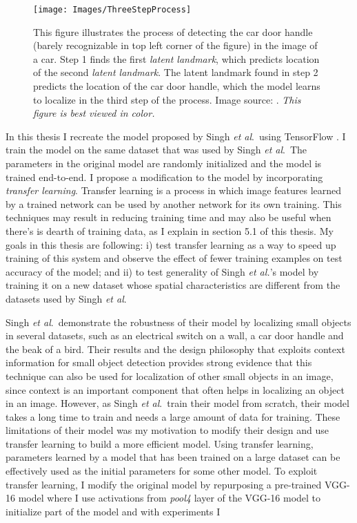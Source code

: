 \documentclass [11pt,letterpaper ,twoside ,openany ]{report}
\begin{document}
    \begin{wrapfigure}{l}[9mm]{0.5\textwidth}
        \begin{center}
            \texttt{[image: Images/ThreeStepProcess]}
        \end{center}
        \caption{This figure illustrates the process of detecting the car door handle (barely recognizable in top left corner of the figure) in the image of a car. Step 1 finds the first \textit{latent landmark}, which predicts location of the second \textit{latent landmark}. The latent landmark found in step 2 predicts the location of the car door handle, which the model learns to localize in the third step of the process. Image source: \cite{Singh_2016_CVPR}. \textit{This figure is best viewed in color.}}
    \end{wrapfigure}            

    In this thesis I recreate the model proposed by Singh \textit{et al}.\ using TensorFlow \cite{girija2016tensorflow}. I train the model on the same dataset that was used by Singh \textit{et al}.\ The parameters in the original model are randomly initialized and the model is trained end-to-end. I propose a modification to the model by incorporating \textit {transfer learning}. Transfer learning is a process in which image features learned by a trained network can be used by another network for its own training. This techniques may result in reducing training time and may also be useful when there's is dearth of training data, as I explain in section 5.1 of this thesis. My goals in this thesis are following: i) test transfer learning as a way to speed up training of this system and observe the effect of fewer training examples on test accuracy of the model; and ii) to test generality of Singh \textit{et al.}'s model by training it on a new dataset whose spatial characteristics are different from the datasets used by Singh \textit{et al}.\

    Singh \textit {et al}.\ demonstrate the robustness of their model by localizing small objects in several datasets, such as an electrical switch on a wall, a car door handle and the beak of a bird. Their results and the design philosophy that exploits context information for small object detection provides strong evidence that this technique can also be used for localization of other small objects in an image, since context is an important component that often helps in localizing an object in an image. However, as Singh \textit{et al}.\ train their model from scratch, their model takes a long time to train and needs a large amount of data for training. These limitations of their model was my motivation to modify their design and use transfer learning to build a more efficient model. Using transfer learning, parameters learned by a model that has been trained on a large dataset can be effectively used as the initial parameters for some other model. To exploit transfer learning, I modify the original model by repurposing a pre-trained VGG-16 \cite{simonyan2014very} model where I use activations from \textit{pool4} layer of the VGG-16 model to initialize part of the model and with experiments I 
\end{document}
